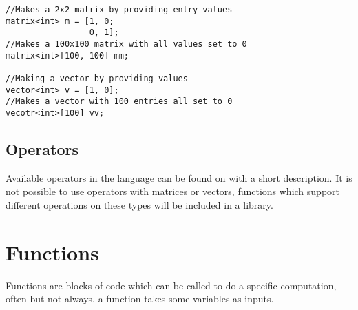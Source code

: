 \begin{lstlisting}[caption={Syntax for creating a matrix or vector},label={lst:matrix},numbers=none]
//Makes a 2x2 matrix by providing entry values
matrix<int> m = [1, 0; 
                 0, 1];
//Makes a 100x100 matrix with all values set to 0
matrix<int>[100, 100] mm;

//Making a vector by providing values
vector<int> v = [1, 0];
//Makes a vector with 100 entries all set to 0
vecotr<int>[100] vv;
\end{lstlisting}

\subsection*{Operators}
Available operators in the language can be found on  with a short description.  
It is not possible to use operators with matrices or vectors, functions which support different operations on these types will be included in a library.



\section{Functions}\label{sec:funcs}
Functions are blocks of code which can be called to do a specific computation, often but not always, a function takes some variables as inputs.

